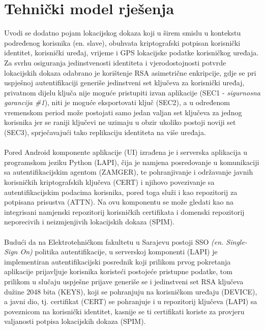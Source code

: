 \section{Tehnički model rješenja}
Uvodi se dodatno pojam lokacijskog dokaza\cite{locproof} koji u širem smislu u kontekstu podređenog korisnika (en. slave), obuhvata kriptografski potpisan korisnički identitet, korisnički uređaj, vrijeme i GPS lokacijske podatke korisničkog uređaja. Za svrhu osiguranja jedinstvenosti identiteta i vjerodostojnosti potvrde lokacijskih dokaza odabrano je korištenje RSA asimetrične enkripcije, gdje se pri uspješnoj autentifikaciji generiše jedinstveni set ključeva za korisnički uređaj, privatnom dijelu ključa nije moguće pristupiti izvan aplikacije (SEC1 - \textit{sigurnosna garancija \#1}), niti je moguće eksportovati ključ (SEC2), a u određenom vremenskom period može postojati samo jedan valjan set ključeva za jednog korisnika jer se raniji ključevi ne uzimaju u obzir ukoliko postoji noviji set (SEC3), sprječavajući tako replikaciju identiteta na više uređaja.

\paragraph*{}
Pored Android komponente aplikacije (UI) izrađena je i serverska aplikacija u programskom jeziku Python (LAPI), čija je namjena posredovanje u komunikaciji sa autentifikacijskim agentom (ZAMGER), te pohranjivanje i održavanje javnih korisničkih kriptografskih ključeva (CERT) i njihovo povezivanje sa autentifikacijskim podacima korisnika, pored toga služi i kao repozitorij za potpisana prisustva (ATTN). Na ovu komponentu se može gledati kao na integrisani namjenski repozitorij korisničkih certifikata i domenski repozitorij neporecivih i neizmjenjivih lokacijskih dokaza (SPIM).

\paragraph*{}
Budući da na Elektrotehničkom fakultetu u Sarajevu postoji SSO \textit{(en. Single-Sign On)} politika autentifikacije, u serverskoj komponenti (LAPI) je implementiran autentifikacijski posrednik koji prilikom prvog pokretanja aplikacije prijavljuje korisnika koristeći postojeće pristupne podatke, tom prilikom u slučaju uspješne prijave generiše se i jedinstveni set RSA ključeva dužine 2048 bita (KEYS), koji se pohranjuju na korisničkom uređaju (DEVICE), a javni dio, tj. certifikat (CERT) se pohranjuje i u repozitorij ključeva (LAPI) sa poveznicom na korisnički identitet, kasnije se ti certifikati koriste za provjeru valjanosti potpisa lokacijskih dokaza (SPIM).

